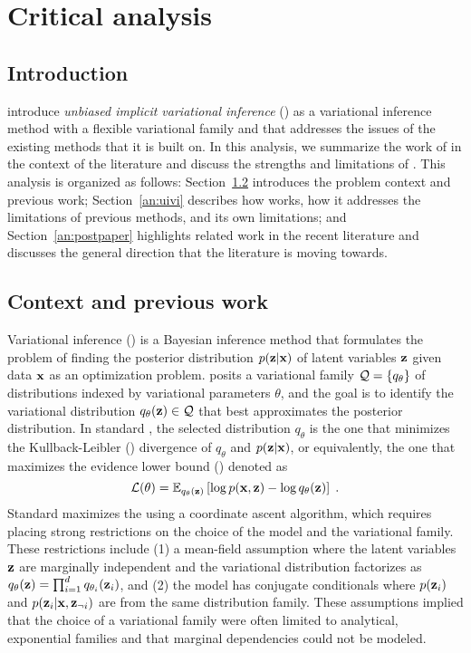 \documentclass[10pt]{article}
\title{\todo}
\author{Kenny Chiu}
\date{\today}
\begin{document}
\maketitle


\newpage


\section{Critical analysis}

\subsection{Introduction}

\citet{Titsias:2019} introduce \textit{unbiased implicit variational inference} (\uivi) as a variational inference method with a flexible variational family and that addresses the issues of the existing methods that it is built on. In this analysis, we summarize the work of \citet{Titsias:2019} in the context of the literature and discuss the strengths and limitations of \uivi. This analysis is organized as follows: Section~\ref{an:literature} introduces the problem context and previous work; Section~\ref{an:uivi} describes how \uivi works, how it addresses the limitations of previous methods, and its own limitations; and Section~\ref{an:postpaper} highlights related work in the recent literature and discusses the general direction that the literature is moving towards.

\subsection{Context and previous work} \label{an:literature}

Variational inference (\vi) \citep{Jordan:1999} is a Bayesian inference method that formulates the problem of finding the posterior distribution $p(\mathbf{z}|\mathbf{x})$ of latent variables $\mathbf{z}$ given data $\mathbf{x}$ as an optimization problem. \vi posits a variational family $\mathcal{Q}=\{q_\theta\}$ of distributions indexed by variational parameters $\theta$, and the goal is to identify the variational distribution $q_\theta(\mathbf{z})\in\mathcal{Q}$ that best approximates the posterior distribution. In standard \vi, the selected distribution $q_\theta$ is the one that minimizes the Kullback-Leibler (\kl) divergence of $q_\theta$ and $p(\mathbf{z}|\mathbf{x})$, or equivalently, the one that maximizes the evidence lower bound (\elbo) denoted as
\[
\mathcal{L}(\theta) = \mathbb{E}_{q_\theta(\mathbf{z})}\left[\log p(\mathbf{x},\mathbf{z}) - \log q_\theta(\mathbf{z})\right] \;.
\]
Standard \vi maximizes the \elbo using a coordinate ascent algorithm, which requires placing strong restrictions on the choice of the model and the variational family. These restrictions include (1) a mean-field assumption where the latent variables $\mathbf{z}$ are marginally independent and the variational distribution factorizes as $q_\theta(\mathbf{z})=\prod_{i=1}^dq_{\theta_i}(\mathbf{z}_i)$, and (2) the model has conjugate conditionals where $p(\mathbf{z}_i)$ and $p(\mathbf{z}_i|\mathbf{x},\mathbf{z}_{\neg i})$ are from the same distribution family. These assumptions implied that the choice of a variational family were often limited to analytical, exponential families and that marginal dependencies could not be modeled.
\\
\end{document}
